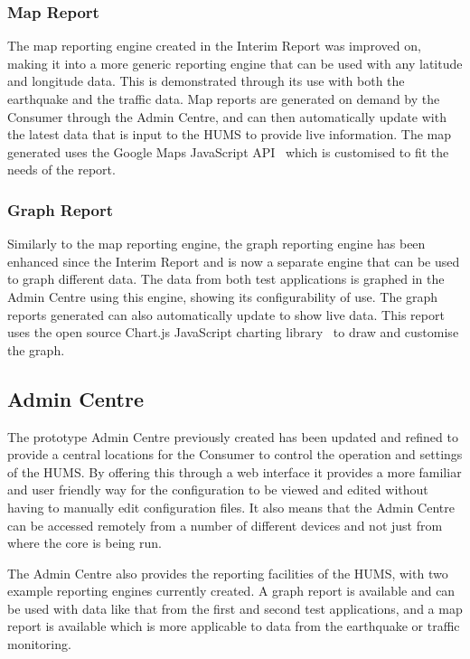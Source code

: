 \documentclass[10pt,a4paper]{article}
\begin{document}
\subsubsection{Map Report}
The map reporting engine created in the Interim Report was improved on, making it into a more generic reporting engine that can be used with any latitude and longitude data. This is demonstrated through its use with both the earthquake and the traffic data. Map reports are generated on demand by the Consumer through the Admin Centre, and can then automatically update with the latest data that is input to the HUMS to provide live information. The map generated uses the Google Maps JavaScript API~\cite{g_maps} which is customised to fit the needs of the report.

\subsubsection{Graph Report}
Similarly to the map reporting engine, the graph reporting engine has been enhanced since the Interim Report and is now a separate engine that can be used to graph different data. The data from both test applications is graphed in the Admin Centre using this engine, showing its configurability of use. The graph reports generated can also automatically update to show live data. This report uses the open source Chart.js JavaScript charting library~\cite{chart_js} to draw and customise the graph.

\subsection{Admin Centre}
\label{sec:admin}

The prototype Admin Centre previously created has been updated and refined to provide a central locations for the Consumer to control the operation and settings of the HUMS. By offering this through a web interface it provides a more familiar and user friendly way for the configuration to be viewed and edited without having to manually edit configuration files. It also means that the Admin Centre can be accessed remotely from a number of different devices and not just from where the core is being run.

The Admin Centre also provides the reporting facilities of the HUMS, with two example reporting engines currently created. A graph report is available and can be used with data like that from the first and second test applications, and a map report is available which is more applicable to data from the earthquake or traffic monitoring.
\end{document}
